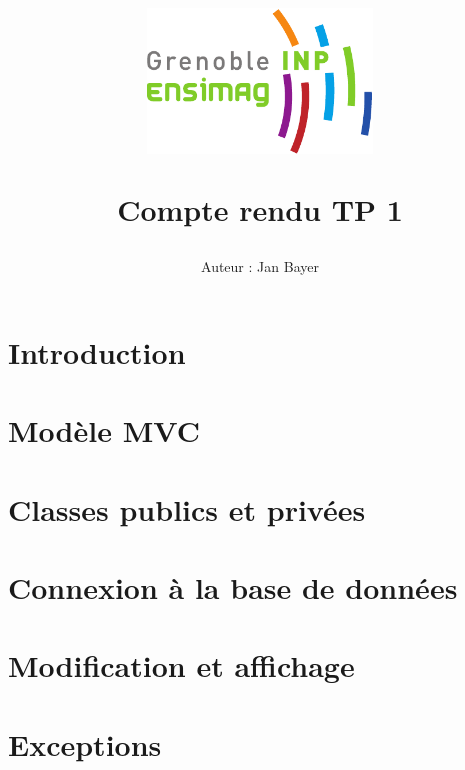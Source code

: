 \documentclass[10pt]{article}
\title{\begin{center}
\includegraphics[width=6cm]{ENSIMAG-eps-converted-to.pdf}
\end{center} \vspace{1cm} Compte rendu TP 1}
\author{Auteur : Jan Bayer }
\begin{document}
\maketitle

\section{Introduction}
\section{Modèle MVC}
\section{Classes publics et privées}
\section{Connexion à la base de données}
\section{Modification et affichage}


 \section{Exceptions}
\end{document}
